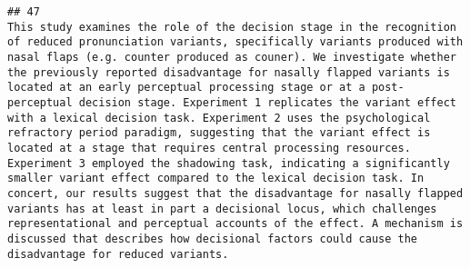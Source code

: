\documentclass[
  english,
  man]{apa6}
\begin{document}
\begin{verbatim}
## 47                                                                                                                                                                                                                                                                                                                                                                                                                                                                                                                                                                                                                                                                                                                                                                                                                                                                                                                                                                                                                                                                                                                                                                                                                                                                                                                                                                                                                                                                                                                                                                                   This study examines the role of the decision stage in the recognition of reduced pronunciation variants, specifically variants produced with nasal flaps (e.g. counter produced as couner). We investigate whether the previously reported disadvantage for nasally flapped variants is located at an early perceptual processing stage or at a post-perceptual decision stage. Experiment 1 replicates the variant effect with a lexical decision task. Experiment 2 uses the psychological refractory period paradigm, suggesting that the variant effect is located at a stage that requires central processing resources. Experiment 3 employed the shadowing task, indicating a significantly smaller variant effect compared to the lexical decision task. In concert, our results suggest that the disadvantage for nasally flapped variants has at least in part a decisional locus, which challenges representational and perceptual accounts of the effect. A mechanism is discussed that describes how decisional factors could cause the disadvantage for reduced variants.

\end{verbatim}
\end{document}
